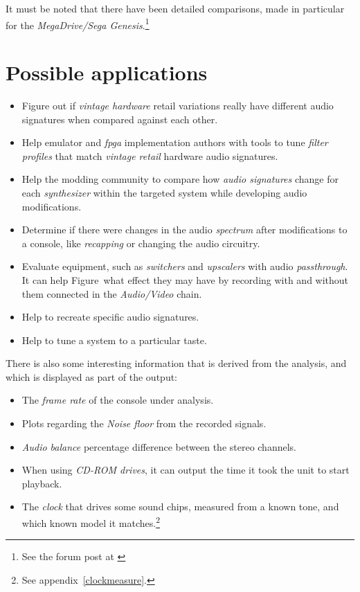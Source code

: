 \documentclass[10pt,a4paper]{report}
\newcommand{\ac}[1]{\textit{\mbox{\acrshort{#1}}}}
\begin{document}
It must be noted that there have been detailed comparisons, made in particular for the \textit{MegaDrive/Sega Genesis}.\footnote{See the forum post at \cite{genesisaudio}}

\section{Possible applications}

\begin{itemize}
	\item Figure out if \textit{vintage hardware} retail variations really have different audio signatures when compared against each other.
	\item Help emulator and \ac{fpga} implementation authors with tools to tune \textit{filter profiles} that match \textit{vintage retail} hardware audio signatures.
	\item Help the modding community to compare how \textit{audio signatures} change for each \textit{synthesizer} within the targeted system while developing audio modifications.
	\item Determine if there were changes in the audio \textit{spectrum} after modifications to a console, like \textit{recapping} or changing the audio circuitry.
	\item Evaluate equipment, such as \textit{switchers} and \textit{upscalers} with audio \textit{passthrough}. It can help Figure~what effect they may have by recording with and without them connected in the \textit{Audio/Video} chain.
	\item Help to recreate specific audio signatures.
	\item Help to tune a system to a particular taste.
\end{itemize}

There is also some interesting information that is derived from the analysis, and which is displayed as part of the output:

\begin{itemize}
	\item The \textit{frame rate} of the console under analysis.
	\item Plots regarding the \textit{Noise floor} from the recorded signals.
	\item \textit{Audio balance} percentage difference between the stereo channels.
	\item When using \textit{CD-ROM drives}, it can output the time it took the unit to start playback.
	\item The \textit{clock} that drives some sound chips, measured from a known tone, and which known model it matches.\footnote{See appendix~\ref{clockmeasure}.}
\end{itemize}
\end{document}
